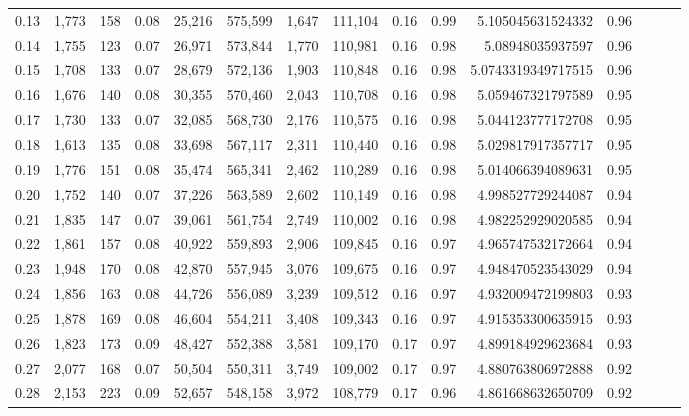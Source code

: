\begin{tabular}{rrrrrrrrrrrrrrr}
0.13 &   1,773 &    158 &  0.08 &   25,216 &  575,599 &    1,647 &  111,104 &  0.16 &  0.99 &     5.105045631524332 &      0.96 \\
0.14 &   1,755 &    123 &  0.07 &   26,971 &  573,844 &    1,770 &  110,981 &  0.16 &  0.98 &      5.08948035937597 &      0.96 \\
0.15 &   1,708 &    133 &  0.07 &   28,679 &  572,136 &    1,903 &  110,848 &  0.16 &  0.98 &    5.0743319349717515 &      0.96 \\
0.16 &   1,676 &    140 &  0.08 &   30,355 &  570,460 &    2,043 &  110,708 &  0.16 &  0.98 &     5.059467321797589 &      0.95 \\
0.17 &   1,730 &    133 &  0.07 &   32,085 &  568,730 &    2,176 &  110,575 &  0.16 &  0.98 &     5.044123777172708 &      0.95 \\
0.18 &   1,613 &    135 &  0.08 &   33,698 &  567,117 &    2,311 &  110,440 &  0.16 &  0.98 &     5.029817917357717 &      0.95 \\
0.19 &   1,776 &    151 &  0.08 &   35,474 &  565,341 &    2,462 &  110,289 &  0.16 &  0.98 &     5.014066394089631 &      0.95 \\
0.20 &   1,752 &    140 &  0.07 &   37,226 &  563,589 &    2,602 &  110,149 &  0.16 &  0.98 &     4.998527729244087 &      0.94 \\
0.21 &   1,835 &    147 &  0.07 &   39,061 &  561,754 &    2,749 &  110,002 &  0.16 &  0.98 &     4.982252929020585 &      0.94 \\
0.22 &   1,861 &    157 &  0.08 &   40,922 &  559,893 &    2,906 &  109,845 &  0.16 &  0.97 &     4.965747532172664 &      0.94 \\
0.23 &   1,948 &    170 &  0.08 &   42,870 &  557,945 &    3,076 &  109,675 &  0.16 &  0.97 &     4.948470523543029 &      0.94 \\
0.24 &   1,856 &    163 &  0.08 &   44,726 &  556,089 &    3,239 &  109,512 &  0.16 &  0.97 &     4.932009472199803 &      0.93 \\
0.25 &   1,878 &    169 &  0.08 &   46,604 &  554,211 &    3,408 &  109,343 &  0.16 &  0.97 &     4.915353300635915 &      0.93 \\
0.26 &   1,823 &    173 &  0.09 &   48,427 &  552,388 &    3,581 &  109,170 &  0.17 &  0.97 &     4.899184929623684 &      0.93 \\
0.27 &   2,077 &    168 &  0.07 &   50,504 &  550,311 &    3,749 &  109,002 &  0.17 &  0.97 &     4.880763806972888 &      0.92 \\
0.28 &   2,153 &    223 &  0.09 &   52,657 &  548,158 &    3,972 &  108,779 &  0.17 &  0.96 &     4.861668632650709 &      0.92 \\

\end{tabular}
